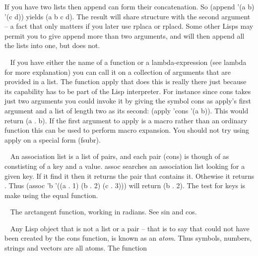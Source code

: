 \begin{description}
If you have two lists then {\tx append} can form their concatenation.
So {\tx (append '(a b) '(c d))} yields {\tx (a b c d)}. The
result will share structure with the second argument -- a fact that only
matters if you later use {\tx rplaca} or {\tx rplacd}. Some
other Lisps may permit you to give {\tx append} more than two arguments,
and will then append all the lists into one, but \vsl{} does not.
\item[{\tx apply~~~~~~~~} \hspace{1cm} {\em function 2 args}]~\newline
If you have either the name of a function or a lambda-expression (see
{\tx lambda} for more explanation) you can call it on a collection of
arguments that are provided in a list. The function {\tx apply} that
does this is really there just because its capability has to be part of the
Lisp interpreter. For instance since {\tx cons} takes just two
arguments you could invoke it by giving the symbol {\tx cons} as
{\tx apply}'s first argument and a list of length two as its second:
{\tx (apply 'cons '(a b))}. This would return {\tx (a . b)}.
If the first argument to {\tx apply} is a macro rather than an ordinary
function this can be used to perform macro expansion. You should not
try using {\tx apply} on a special form ({\tx fsubr}).
\item[{\tx assoc~~~~~~~~} \hspace{1cm} {\em function 2 args}]~\newline
An association list is a list of pairs, and each pair ({\tx cons}) is
though of as constisting of a key and a value. {\tx assoc} searches
an association list looking for a given key. If it find it then it returns
the pair that contains it. Othewise it returns \nil. Thus
{\tx (assoc 'b '((a . 1) (b . 2) (c . 3)))} will return
{\tx (b . 2)}. The test for keys is make using the {\tx equal}
function.
\item[{\tx atan~~~~~~~~~} \hspace{1cm} {\em special form}]~\newline
The arctangent function, working in radians. See {\tx sin} and {\tx cos}.
\item[{\tx atom~~~~~~~~~} \hspace{1cm} {\em function 1 arg}]~\newline
Any Lisp object that is not a list or a pair -- that is to say that could
not have been created by the {\tx cons} function, is known as an {\em atom}.
Thus symbols, numbers, strings and vectors are all atoms. The function

\end{description}
